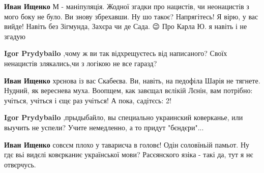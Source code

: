 \begin{itemize}
\begin{itemize}
 
\textbf{Иван Ищенко} М - маніпуляція. Жодної згадки про нацистів, чи неонацистів з мого боку не було. Ви знову збрехавши. Ну шо такоє? Напрягітесь! Я вірю, у вас вийде! Навіть без Зігмунда, Захєра чи де Сада. 😉 Про Карла Ю. я навіть і не згадую

 
\textbf{Igor Prydybailo} ,чому ж ви так відхрещуєтесь від написаного? Своїх ненацистів злякались,чи з логікою не все гаразд?

 
\textbf{Иван Ищенко} хрєнова із вас Скабеєва. Ви, навіть, на педофіла Шарія не тягнете. Нудний, як вереснева муха.
Воопщем, как завєщал вєлікій Лєнін, вам потрібно: учіться, учіться і єщє раз учіться!
А пока, садітєсь: 2!

 
\textbf{Igor Prydybailo} ,прыдыбайло, вы специально украинский коверканье, или
выучить не успели? Учите немедленно, а то придут "бєндєри"...

 
\textbf{Иван Ищенко} совсєм плохо у таварисча в головє! Одін соловїньій памьот.
Ну гдє вьі видєлі ковєрканиє української мови? Расєянского язіка - такі да, тут
я нє отвєрчусь.


\end{itemize}
\end{itemize}
